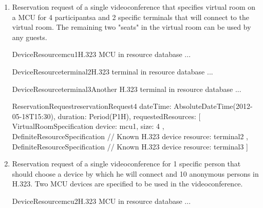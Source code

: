 \begin{enumerate}
\begin{EntityExample}{ReservationRequest}{reservationRequest3}{}
dateTime: AbsoluteDateTime(2012-05-18T15:30), duration: Period(P1H),
requestedPersons: [
  PersonByIdentity(srom@cesnet.cz),  // Martin Srom (must choose a device)
  PersonByIdentity(hopet@cesnet.cz), // Petr Holub (must choose a device)
  Person { // Jan Ruzicka (must choose a device)
    name: Jan Ruzicka,
    email: janru@cesnet.cz
  }
]
\end{EntityExample}

\item Reservation request of a single videoconference that specifies virtual room on a MCU for 4 participantsa and 2 specific terminals that will connect to the virtual room. The remaining two "seats" in the virtual room can be used by any guests.

\begin{EntityExample}{DeviceResource}{mcu1}{H.323 MCU in resource database}
...
\end{EntityExample}

\begin{EntityExample}{DeviceResource}{terminal2}{H.323 terminal in resource database}
...
\end{EntityExample}

\begin{EntityExample}{DeviceResource}{terminal3}{Another H.323 terminal in resource database}
...
\end{EntityExample}

\begin{EntityExample}{ReservationRequest}{reservationRequest4}{}
dateTime: AbsoluteDateTime(2012-05-18T15:30), duration: Period(P1H),
requestedResources: [
  VirtualRoomSpecification {
    device: mcu1,
    size: 4
  },
  DefiniteResourceSpecification { // Known H.323 device
    resource: terminal2
  },
  DefiniteResourceSpecification { // Known H.323 device
    resource: terminal3
  }
]
\end{EntityExample}

\item Reservation request of a single videoconference for 1 specific person that should choose a device by which he will connect and 10 anonymous persons in H.323. Two MCU devices are specified to be used in the videoconference.


\begin{EntityExample}{DeviceResource}{mcu2}{H.323 MCU in resource database}
...
\end{EntityExample}


\end{enumerate}

